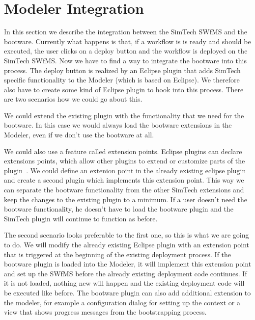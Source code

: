 \section{Modeler Integration}
\label{implementation:modeler_integration}

In this section we describe the integration between the SimTech SWfMS and the bootware.
Currently what happens is that, if a workflow is is ready and should be executed, the user clicks on a deploy button and the workflow is deployed on the SimTech SWfMS.
Now we have to find a way to integrate the bootware into this process.
The deploy button is realized by an Eclipse plugin that adds SimTech specific functionality to the Modeler (which is based on Eclipse).
We therefore also have to create some kind of Eclipse plugin to hook into this process.
There are two scenarios how we could go about this.

We could extend the existing plugin with the functionality that we need for the bootware.
In this case we would always load the bootware extensions in the Modeler, even if we don't use the bootware at all.

We could also use a feature called extension points.
Eclipse plugins can declare extensions points, which allow other plugins to extend or customize parts of the plugin~\autocite{extensionpoints}.
We could define an extenion point in the already existing eclipse plugin and create a second plugin which implements this extension point.
This way we can separate the bootware functionality from the other SimTech extensions and keep the changes to the existing plugin to a minimum.
If a user doesn't need the bootware functionality, he doesn't have to load the bootware plugin and the SimTech plugin will continue to function as before.

The second scenario looks preferable to the first one, so this is what we are going to do.
We will modify the already existing Eclipse plugin with an extension point that is triggered at the beginning of the existing deployment process.
If the bootware plugin is loaded into the Modeler, it will implement this extension point and set up the SWfMS before the already existing deployment code continues.
If it is not loaded, nothing new will happen and the existing deployment code will be executed like before.
The bootware plugin can also add additional extension to the modeler, for example a configuration dialog for setting up the context or a view that shows progress messages from the bootstrapping process.
